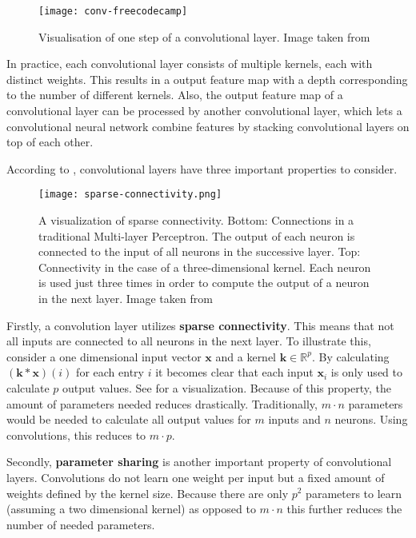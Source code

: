 \begin{figure}[htb!]
    \centering
    \texttt{[image: conv-freecodecamp]}
    \caption{Visualisation of one step of a convolutional layer. Image taken from \cite{dertat_applied_2017}}
    \label{fig:conv-vis}
\end{figure}

In practice, each convolutional layer consists of multiple kernels, each with distinct weights.
This results in a output feature map with a depth corresponding to the number of different kernels.
Also, the output feature map of a convolutional layer can be processed by another convolutional layer, which lets a convolutional neural network combine features by stacking convolutional layers on top of each other.

According to \cite{goodfellow_deep_2016}, convolutional layers have three important properties to consider.

\begin{figure}[htb!]
    \centering
    \texttt{[image: sparse-connectivity.png]}
    \caption{A visualization of sparse connectivity. Bottom: Connections in a traditional Multi-layer Perceptron. The output of each neuron is connected to the input of all neurons in the successive layer. Top: Connectivity in the case of a three-dimensional kernel. Each neuron is used just three times in order to compute the output of a neuron in the next layer. Image taken from \cite{goodfellow_deep_2016}}
    \label{fig:sparse-connectivity}
\end{figure}

Firstly, a convolution layer utilizes \textbf{sparse connectivity}.
This means that not all inputs are connected to all neurons in the next layer.
To illustrate this, consider a one dimensional input vector $\bm{x}$ and a kernel $\bm{k} \in \mathbb{R}^p$.
By calculating $(\bm{k} * \bm{x})(i)$ for each entry $i$ it becomes clear that each input $\bm{x}_i$ is only used to calculate $p$ output values.
See  for a visualization.
Because of this property, the amount of parameters needed reduces drastically.
Traditionally, $m \cdot n$ parameters would be needed to calculate all output values for $m$ inputs and $n$ neurons.
Using convolutions, this reduces to $m \cdot p$.

Secondly, \textbf{parameter sharing} is another important property of convolutional layers.
Convolutions do not learn one weight per input but a fixed amount of weights defined by the kernel size.
Because there are only $p^2$ parameters to learn (assuming a two dimensional kernel) as opposed to $m \cdot n$ this further reduces the number of needed parameters.

